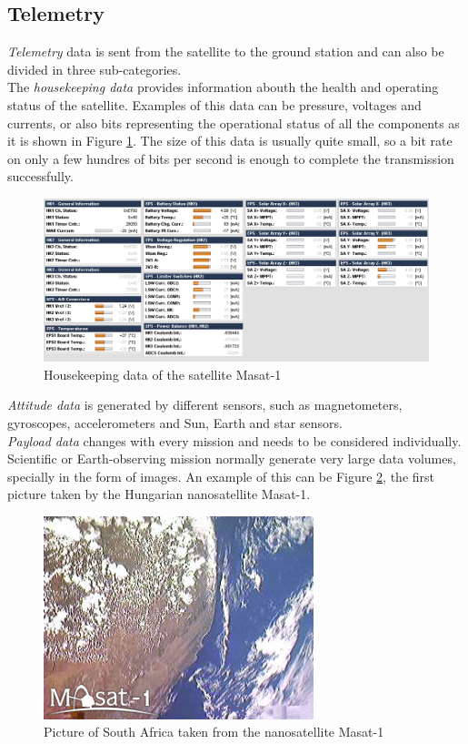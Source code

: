 \subsection{Telemetry}

\emph{Telemetry} data is sent from the satellite to the ground station and can also be divided in three sub-categories.\\

The \emph{housekeeping data} provides information abouth the health and operating status of the satellite. Examples of this data can be pressure, voltages and currents, or also bits representing the operational status of all the components as it is shown in Figure \ref{f3.1}. The size of this data is usually quite small, so a bit rate on only a few hundres of bits per second is enough to complete the transmission successfully.

\begin{figure}[H]
\centerline{\includegraphics[width=1\textwidth]{images/housekeeping.png}}
\caption{Housekeeping data of the satellite Masat-1}
\label{f3.1}
\end{figure}

\emph{Attitude data} is generated by different sensors, such as magnetometers, gyroscopes, accelerometers and Sun, Earth and star sensors.\\

\emph{Payload data} changes with every mission and needs to be considered individually. Scientific or Earth-observing mission normally generate very large data volumes, specially in the form of images. An example of this can be Figure \ref{f3.2}, the first picture taken by the Hungarian nanosatellite Masat-1\cite{Masat}.

\begin{figure}[H]
\centerline{\includegraphics[width=0.7\textwidth]{images/masat.jpg}}
\caption{Picture of South Africa taken from the nanosatellite Masat-1}
\label{f3.2}
\end{figure}
\pagebreak

